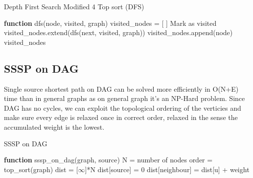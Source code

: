 \documentclass[12pt]{extarticle}
\begin{document}
\begin{algorithm} [H]
    \caption{Depth First Search Modified 4 Top sort (DFS)}
    \begin{algorithmic}[1]
        \STATE \textbf{function} dfs(node, visited, graph)
        \STATE visited\_nodes = [ ]
        \RETURN
        \ENDIF
        \STATE Mark as visited
        \STATE visited\_nodes.extend(dfs(next, visited, graph))
        \ENDFOR
        \STATE visited\_nodes.append(node)
        \RETURN visited\_nodes
    \end{algorithmic}
\end{algorithm}

\subsection{SSSP on DAG}
Single source shortest path on DAG can be solved more efficiently in O(N+E) time 
than in general graphs as on general graph it's an NP-Hard problem. Since DAG
has no cycles, we can exploit the topological ordering of the verticies and make
sure every edge is relaxed once in correct order, relaxed in the sense the accumulated
weight is the lowest. 

\begin{algorithm}[H]
\caption{SSSP on DAG}
\begin{algorithmic}
    \STATE \textbf{function} sssp\_on\_dag(graph, source)
    \STATE N = number of nodes
    \STATE order = top\_sort(graph)
    \STATE dist = [$\infty$]*N
    \STATE dist[source] = 0
    \STATE dist[neighbour] = dist[u] + weight
    \ENDIF
    \ENDFOR
    \ENDFOR
\end{algorithmic}
\end{algorithm}
\end{document}
